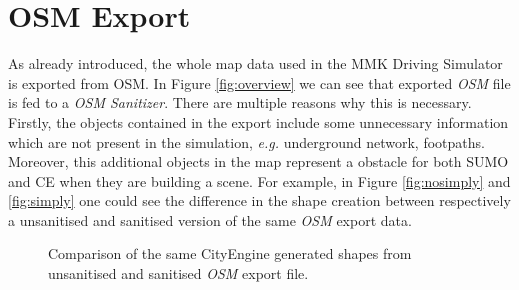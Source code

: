 \section{OSM Export}
As already introduced, the whole map data used in the MMK Driving Simulator is exported from OSM. In Figure \ref{fig:overview} we can see that exported \emph{OSM} file is fed to a \emph{OSM Sanitizer}. There are multiple reasons why this is necessary. Firstly, the objects contained in the export include some unnecessary information which are not present in the simulation, \emph{e.g.} underground network, footpaths. Moreover, this additional objects in the map represent a obstacle for both SUMO and CE when they are building a scene. For example, in Figure \ref{fig:nosimply} and \ref{fig:simply} one could see the difference in the shape creation between respectively a unsanitised and sanitised version of the same \emph{OSM} export data.  

\begin{figure}[htb]
	\centering
	\hspace{0.05\textwidth}%
	\caption{Comparison of the same CityEngine generated shapes from unsanitised and sanitised \emph{OSM} export file.}
\end{figure}

